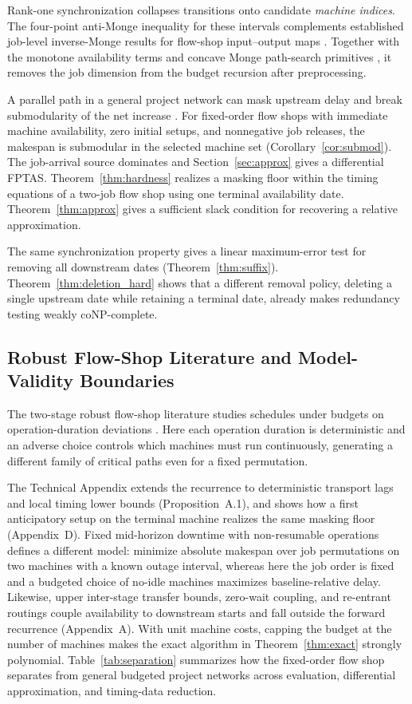 \documentclass[11pt,letterpaper]{article}
\begin{document}
Rank-one synchronization collapses transitions onto candidate \emph{machine indices}. The four-point anti-Monge inequality for these intervals complements established job-level inverse-Monge results for flow-shop input--output maps \citep[][\S12]{Imaev2009}. Together with the monotone availability terms and concave Monge path-search primitives \citep{Aggarwal1994,Galil1990}, it removes the job dimension from the budget recursion after preprocessing.

A parallel path in a general project network can mask upstream delay and break submodularity of the net increase \citep{Wu2026}. For fixed-order flow shops with immediate machine availability, zero initial setups, and nonnegative job releases, the makespan is submodular in the selected machine set (Corollary~\ref{cor:submod}). The job-arrival source dominates and Section~\ref{sec:approx} gives a differential FPTAS. Theorem~\ref{thm:hardness} realizes a masking floor within the timing equations of a two-job flow shop using one terminal availability date. Theorem~\ref{thm:approx} gives a sufficient slack condition for recovering a relative approximation.

The same synchronization property gives a linear maximum-error test for removing all downstream dates (Theorem~\ref{thm:suffix}). Theorem~\ref{thm:deletion_hard} shows that a different removal policy, deleting a single upstream date while retaining a terminal date, already makes redundancy testing weakly coNP-complete.

\subsection{Robust Flow-Shop Literature and Model-Validity Boundaries}

The two-stage robust flow-shop literature studies schedules under budgets on operation-duration deviations \citep{Levorato2022,Juvin2025}. Here each operation duration is deterministic and an adverse choice controls which machines must run continuously, generating a different family of critical paths even for a fixed permutation.

The Technical Appendix extends the recurrence to deterministic transport lags and local timing lower bounds (Proposition~A.1), and shows how a first anticipatory setup on the terminal machine realizes the same masking floor (Appendix~D). Fixed mid-horizon downtime with non-resumable operations defines a different model: \citet{Lu2026} minimize absolute makespan over job permutations on two machines with a known outage interval, whereas here the job order is fixed and a budgeted choice of no-idle machines maximizes baseline-relative delay. Likewise, upper inter-stage transfer bounds, zero-wait coupling, and re-entrant routings couple availability to downstream starts and fall outside the forward recurrence (Appendix~A). With unit machine costs, capping the budget at the number of machines makes the exact algorithm in Theorem~\ref{thm:exact} strongly polynomial. Table~\ref{tab:separation} summarizes how the fixed-order flow shop separates from general budgeted project networks across evaluation, differential approximation, and timing-data reduction.
\end{document}

